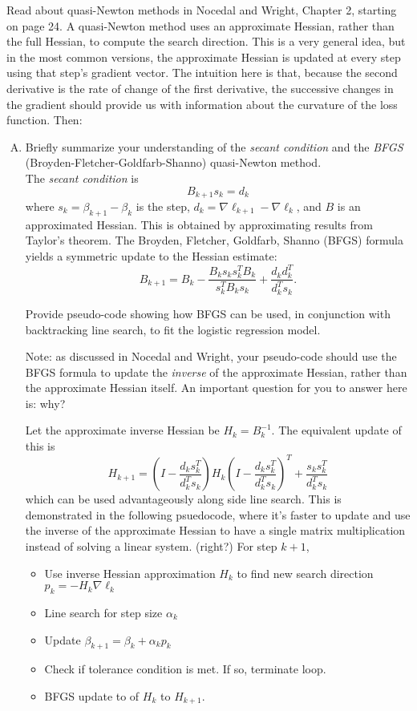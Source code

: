 \documentclass{article}
\begin{document}
Read about quasi-Newton methods in Nocedal and Wright, Chapter 2, starting on page 24.  A quasi-Newton method uses an approximate Hessian, rather than the full Hessian, to compute the search direction.   This is a very general idea, but in the most common versions, the approximate Hessian is updated at every step using that step's gradient vector.  The intuition here is that, because the second derivative is the rate of change of the first derivative, the successive changes in the gradient should provide us with information about the curvature of the loss function.  Then:

\begin{enumerate}[(A)]
\item Briefly summarize your understanding of the \textit{secant condition} and the \textit{BFGS} (Broyden-Fletcher-Goldfarb-Shanno) quasi-Newton method.  \\
\color{blue}
The \textit{secant condition} is 
$$B_{k+1} s_k =d_k $$
 where  $s_k = \beta_{k+1} - \beta_{k}$ is the step, $d_k =\nabla \ell_{k+1} - \nabla \ell_{k}$, and $B$ is an approximated Hessian. This is obtained by approximating results from Taylor's theorem.  The Broyden, Fletcher, Goldfarb, Shanno (BFGS) formula yields a symmetric update to the Hessian estimate: 
$$B_{k+1} = B_k - \frac{B_k s_k s_k^T B_k}{s_k^T B_k s_k} + \frac{d_k d_k^T}{d_k^T s_k}.$$
\color{black}

Provide pseudo-code showing how BFGS can be used, in conjunction with backtracking line search, to fit the logistic regression model.

Note: as discussed in Nocedal and Wright, your pseudo-code should use the BFGS formula to update the \textit{inverse} of the approximate Hessian, rather than the approximate Hessian itself.  An important question for you to answer here is: why?

\color{blue}
Let the approximate inverse Hessian be $H_k = B_k^{-1}$. The equivalent update of this is 
$$H_{k+1} = \left(I - \frac{d_k s_k^T}{d_k^T s_k} \right) H_k \left( I - \frac{d_k s_k^T}{d_k^T s_k}\right)^T + \frac{s_k s_k^T}{d_k^T s_k}$$
which can be used advantageously along side line search. This is demonstrated in the following psuedocode, where it's faster to update and use the inverse of the approximate Hessian to have a single matrix multiplication instead of solving a linear system. (right?)
For step $k+1$, 
\begin{itemize}
	\item Use inverse Hessian approximation $H_k$ to find new search direction $p_k = -H_k \nabla \ell_k$
	\item Line search for step size $\alpha_k$
	\item Update $\beta_{k+1} = \beta_k + \alpha_k p_k$
	\item Check if tolerance condition is met. If so, terminate loop. 
	\item BFGS update to of $H_{k}$ to $H_{k+1}$.
\end{itemize}
\color{black}




\end{enumerate}
\end{document}
